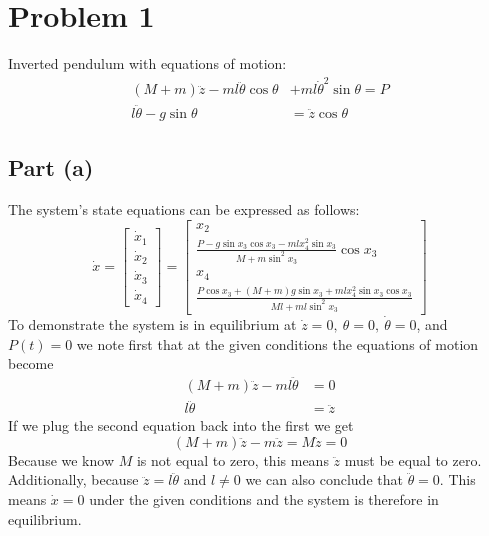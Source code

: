 \documentclass[11pt]{article}
\begin{document}
\thispagestyle{empty}

\newlength{\boxlength}\setlength{\boxlength}{\textwidth}
\addtolength{\boxlength}{-4mm}

\begin{center}
\end{center}

\section*{Problem 1}
Inverted pendulum with equations of motion:
\begin{align*}
	(M+m)\ddot{z}-ml\ddot{\theta}\cos\theta&+ml\dot{\theta}^2\sin\theta=P \\
	l\ddot{\theta}-g\sin\theta &= \ddot{z}\cos\theta
\end{align*}
\subsection*{Part (a)}

The system's state equations can be expressed as follows:
\begin{equation*}
	\dot{x} = \begin{bmatrix} \dot{x}_1 \\ \dot{x}_2 \\ \dot{x}_3 \\ \dot{x}_4 \end{bmatrix} = \begin{bmatrix} x_2 \\ \frac{P-g\sin x_3 \cos x_3-mlx_4^2\sin x_3}{M+m\sin^2x_3}\cos x_3 \\ x_4 \\ \frac{P\cos x_3 + (M+m)g\sin x_3 + ml x_4^2\sin x_3 \cos x_3}{Ml + ml\sin^2x_3} \end{bmatrix}
\end{equation*}
To demonstrate the system is in equilibrium at $\dot{z}=0,\ \theta=0,\ \dot{\theta}=0$, and $P(t)=0$ we note first that at the given conditions the equations of motion become 
\begin{align*}
	(M+m)\ddot{z}-ml\ddot{\theta} &= 0 \\
	l\ddot{\theta} &= \ddot{z}
\end{align*}
If we plug the second equation back into the first we get
\begin{equation*}
	(M+m)\ddot{z} - m\ddot{z}=M\ddot{z}=0
\end{equation*}
Because we know $M$ is not equal to zero, this means $\ddot{z}$ must be equal to zero. Additionally, because $\ddot{z} = l\ddot{\theta}$ and $l\neq0$ we can also conclude that $\ddot{\theta}=0$. This means $\dot{x}=0$ under the given conditions and the system is therefore in equilibrium.
\end{document}
